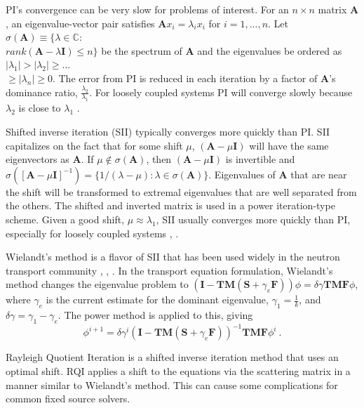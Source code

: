 \documentclass[preprint,12pt]{elsarticle}
\newcommand{\ve}[1]{\ensuremath{\mathbf{#1}}}
\begin{document}
PI's convergence can be very slow for problems of interest. For an $n \times n$ matrix $\ve{A}$, an eigenvalue-vector pair satisfies $\ve{A}x_{i} = \lambda_{i}x_{i}$ for $i = 1,...,n$. Let $\sigma(\ve{A}) \equiv \{\lambda \in \mathbb{C} :$\\$ rank(\ve{A} - \lambda \ve{I}) \le n\}$ be the spectrum of $\ve{A}$ and the eigenvalues be ordered as $|\lambda_{1}| > |\lambda_{2}| \ge \dots $\\$\ge |\lambda_{n}| \ge 0$. The error from PI is reduced in each iteration by a factor of $\ve{A}$'s dominance ratio, $\frac{\lambda_{2}}{\lambda_{1}}$. For loosely coupled systems PI will converge slowly because $\lambda_{2}$ is close to $\lambda_{1}$ \cite{Trefethen1997}. 

Shifted inverse iteration (SII) typically converges more quickly than PI. SII capitalizes on the fact that for some shift $\mu$, $(\ve{A} - \mu \ve{I})$ will have the same eigenvectors as $\ve{A}$. If $\mu \notin \sigma(\ve{A})$, then $(\ve{A} - \mu \ve{I})$ is invertible and $\sigma([\ve{A} - \mu \ve{I}]^{-1}) = \{1/(\lambda - \mu):\lambda \in \sigma(\ve{A})\}$. Eigenvalues of $\ve{A}$ that are near the shift will be transformed to extremal eigenvalues that are well separated from the others. The shifted and inverted matrix is used in a power iteration-type scheme. Given a good shift, $\mu \approx \lambda_1$, SII usually converges more quickly than PI, especially for loosely coupled systems \cite{Trefethen1997}, \cite{Allen2002}.

Wielandt's method is a flavor of SII that has been used widely in the neutron transport community %
\cite{Zinzani2008}, \cite{Itagaki1996}, \cite{Itagaki2002}. In the transport equation formulation, Wielandt's method changes the eigenvalue problem to $(\ve{I} - \ve{TM}(\ve{S} +\gamma_e \ve{F}))\phi = \delta \gamma \ve{TMF} \phi$, where $\gamma_e$ is the current estimate for the dominant eigenvalue, $\gamma_1 = \frac{1}{k}$, and $\delta \gamma = \gamma_1 - \gamma_e$. The power method is applied to this, giving \cite{Nakamura1977}
%
\begin{equation}
\phi^{i+1} = \delta \gamma^{i}(\ve{I} - \ve{TM}(\ve{S} + \gamma_e \ve{F}))^{-1}\ve{TMF}\phi^{i} \:. \label{eq:Wielandt}
\end{equation}

Rayleigh Quotient Iteration is a shifted inverse iteration method that uses an optimal shift. RQI applies a shift to the equations via the scattering matrix in a manner similar to Wielandt's method. This can cause some complications for common fixed source solvers.
\end{document}
